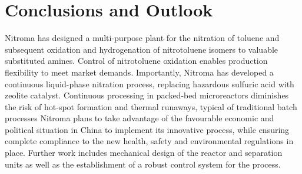 \section{Conclusions and Outlook}
\label{sec:conclu}
Nitroma has designed a multi-purpose plant for the nitration of toluene and subsequent oxidation and hydrogenation of nitrotoluene isomers to valuable substituted amines.
Control of nitrotoluene oxidation enables production flexibility to meet market demands.
Importantly, Nitroma has developed a continuous liquid-phase nitration process, replacing hazardous sulfuric acid with zeolite catalyst.
Continuous processing in packed-bed microreactors diminishes the risk of hot-spot formation and thermal runaways, typical of traditional batch processes
Nitroma plans to take advantage of the favourable economic and political situation in China to implement its innovative process, while ensuring complete compliance to the new health, safety and environmental regulations in place.
Further work includes mechanical design of the reactor and separation units as well as the establishment of a robust control system for the process. 
